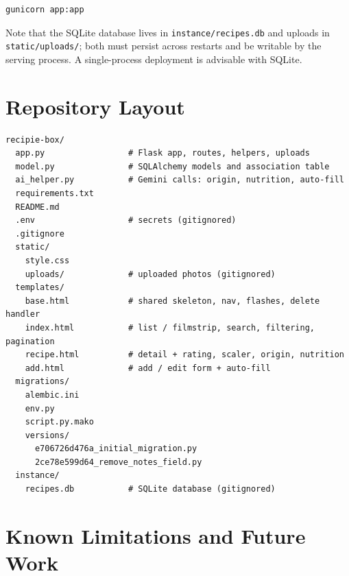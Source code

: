 \documentclass[11pt,a4paper]{article}
\newcommand{\code}[1]{\texttt{#1}}
\begin{document}
\begin{lstlisting}[style=txt,caption={Production run}]
gunicorn app:app
\end{lstlisting}

Note that the SQLite database lives in \code{instance/recipes.db} and uploads
in \code{static/uploads/}; both must persist across restarts and be writable by
the serving process. A single-process deployment is advisable with SQLite.

\section{Repository Layout}

\begin{lstlisting}[style=txt,caption={Project tree (source only)}]
recipie-box/
  app.py                 # Flask app, routes, helpers, uploads
  model.py               # SQLAlchemy models and association table
  ai_helper.py           # Gemini calls: origin, nutrition, auto-fill
  requirements.txt
  README.md
  .env                   # secrets (gitignored)
  .gitignore
  static/
    style.css
    uploads/             # uploaded photos (gitignored)
  templates/
    base.html            # shared skeleton, nav, flashes, delete handler
    index.html           # list / filmstrip, search, filtering, pagination
    recipe.html          # detail + rating, scaler, origin, nutrition
    add.html             # add / edit form + auto-fill
  migrations/
    alembic.ini
    env.py
    script.py.mako
    versions/
      e706726d476a_initial_migration.py
      2ce78e599d64_remove_notes_field.py
  instance/
    recipes.db           # SQLite database (gitignored)
\end{lstlisting}

\section{Known Limitations and Future Work}
\end{document}
